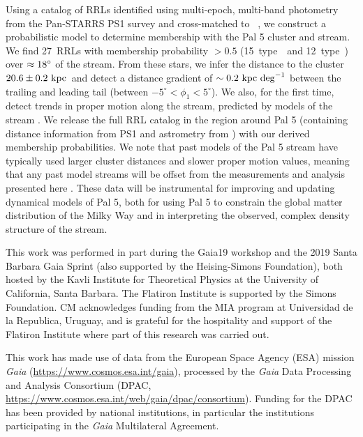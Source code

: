 \documentclass[twocolumn]{aastex63}
\newcommand{\sa}[1]{{\color{teal} SP: #1}}
\newcommand{\clderr}{\ensuremath{20.6 \pm 0.2~\kpc}}
\newcommand{\NRRL}{27}     %
\newcommand{\NRRab}{15}    %
\newcommand{\NRRc}{12}     %
\begin{document}
Using a catalog of RRLs identified using multi-epoch, multi-band photometry from the Pan-STARRS PS1 survey and cross-matched to \Gaia\ , we construct a probabilistic model to determine membership with the Pal 5 cluster and stream.
We find \NRRL\ RRLs with membership probability $>0.5$ (\NRRab\ type~\typeab\ and \NRRc\ type~\typec) over $\approx 18\mbox{$^\circ$}$ of the stream.
From these stars, we infer the distance to the cluster \clderr\ and detect a distance gradient of $\sim 0.2~\mathrm{kpc}~{\rm deg}^{-1}$ between the trailing and leading tail (between $-5^\circ < \phi_1 < 5^\circ$).
We also, for the first time, detect trends in proper motion along the stream, predicted by models of the stream \citep[e.g.,][]{Pearson:2017}.
We release the full RRL catalog in the region around Pal 5 (containing distance information from PS1 and astrometry from \Gaia) with our derived membership probabilities.
We note that past models of the Pal 5 stream have typically used larger cluster distances and slower proper motion values, meaning that any past model streams will be offset from the measurements and analysis presented here \citep[e.g.,][]{Kuepper:2015, Erkal:2017, Pearson:2017}.
These data will be instrumental for improving and updating dynamical models of Pal 5, both for using Pal 5 to constrain the global matter distribution of the Milky Way and in interpreting the observed, complex density structure of the stream.


\acknowledgments
This work was performed in part during the Gaia19 workshop and the 2019 Santa Barbara Gaia Sprint (also supported by the Heising-Simons Foundation), both hosted by the Kavli Institute for Theoretical Physics at the University of California, Santa Barbara. The Flatiron Institute is supported by the Simons Foundation. CM acknowledges funding from the MIA program at Universidad de la Republica, Uruguay, and is grateful for the hospitality and support of the Flatiron Institute where part of this research was carried out.

This work has made use of data from the European Space Agency (ESA) mission
{\it Gaia} (\url{https://www.cosmos.esa.int/gaia}), processed by the {\it Gaia}
Data Processing and Analysis Consortium (DPAC,
\url{https://www.cosmos.esa.int/web/gaia/dpac/consortium}). Funding for the DPAC
has been provided by national institutions, in particular the institutions
participating in the {\it Gaia} Multilateral Agreement.
\end{document}
